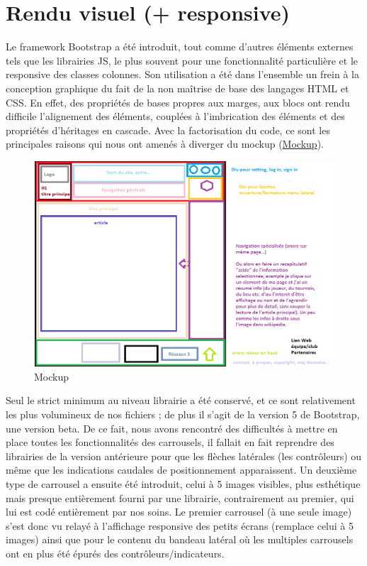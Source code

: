 \documentclass[12pt]{report}
\begin{document}
	    \section {Rendu visuel (+ responsive)}
	    \hypertarget{annexe-rendu-visuel}{}
\par
Le framework Bootstrap a été introduit, tout comme d’autres éléments externes tels que les librairies JS, le plus souvent pour une fonctionnalité particulière et le responsive des classes colonnes. Son utilisation a été dans l’ensemble un frein à la conception graphique du fait de la non maîtrise de base des langages HTML et CSS. En effet, des propriétés de bases propres aux marges, aux blocs ont rendu difficile l’alignement des éléments, couplées à l’imbrication des éléments et des propriétés d’héritages en cascade. Avec la factorisation du code, ce sont les principales raisons qui nous ont amenés à diverger du mockup (\hyperlink{fig-mockup}{Mockup}).
\begin{figure}[h]
\hypertarget{fig-mockup}{}
			\centering
				\includegraphics[width=17cm]{figures/pt-mockup.png}
			\caption{Mockup}
\end{figure}
\bigskip
\par
Seul le strict minimum au niveau librairie a été conservé, et ce sont relativement les plus volumineux de nos fichiers ; de plus il s’agit de la version 5 de Bootstrap, une version beta. De ce fait, nous avons rencontré des difficultés à mettre en place toutes les fonctionnalités des carrousels, il fallait en fait reprendre des librairies de la version antérieure pour que les flèches latérales (les contrôleurs) ou même que les indications caudales de positionnement apparaissent. Un deuxième type de carrousel a ensuite été introduit, celui à 5 images visibles, plus esthétique mais presque entièrement fourni par une librairie, contrairement au premier, qui lui est codé entièrement par nos soins. Le premier carrousel (à une seule image) s’est donc vu relayé à l’affichage responsive des petits écrans (remplace celui à 5 images) ainsi que pour le contenu du bandeau latéral où les multiples carrousels ont en plus été épurés des contrôleurs/indicateurs.
\end{document}
